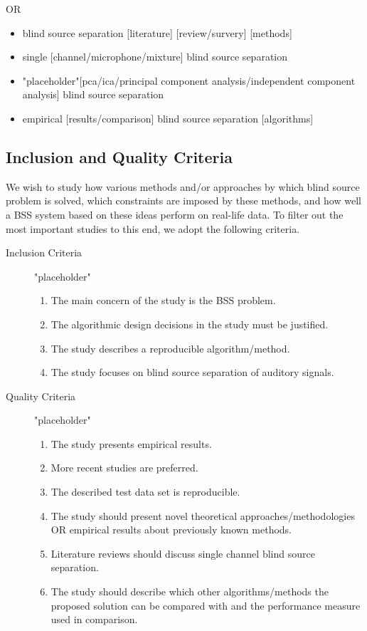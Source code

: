 \documentclass[11pt, oneside, a4paper]{article}
\begin{document}
OR

\begin{itemize}
 \item blind source separation [literature] [review/survery] [methods]
 \item single [channel/microphone/mixture] blind source separation
 \item "placeholder"[pca/ica/principal component analysis/independent component analysis] blind source separation
 \item empirical [results/comparison] blind source separation [algorithms]
\end{itemize}



\subsection{Inclusion and Quality Criteria}
We wish to study how various methods and/or approaches by which blind source problem is solved, which constraints are imposed by these methods, and how well a BSS system based on these ideas perform on real-life data. To filter out the most important studies to this end, we adopt the following criteria.

\begin{description}
	\item[Inclusion Criteria] "placeholder"
		\begin{enumerate}
			\item The main concern of the study is the BSS
                          problem.
			\item The algorithmic design decisions in the study must be justified.
			\item The study describes a reproducible algorithm/method.
			\item The study focuses on blind source separation of auditory signals.
		\end{enumerate}
	\item[Quality Criteria] "placeholder"
		\begin{enumerate}
			\item The study presents empirical results.
			\item More recent studies are preferred.
			\item The described test data set is
                          reproducible.
                        \item The study should present novel
                          theoretical approaches/methodologies OR
                          empirical results about previously known methods. 
			\item Literature reviews should discuss single channel blind source separation.
			\item The study should describe which other algorithms/methods the proposed solution can be compared with and the performance measure used in comparison.
		\end{enumerate}
\end{description}
\end{document}
